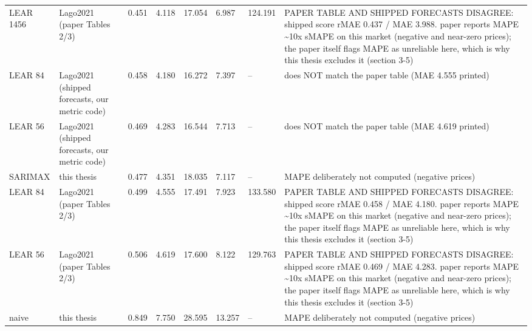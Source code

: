 \begin{table}[htbp]
\begin{tabular}{llllllll}
LEAR 1456 & Lago2021 (paper Tables 2/3) & 0.451 & 4.118 & 17.054 & 6.987 & 124.191 & PAPER TABLE AND SHIPPED FORECASTS DISAGREE: shipped score rMAE 0.437 / MAE 3.988. paper reports MAPE \textasciitilde 10x sMAPE on this market (negative and near-zero prices); the paper itself flags MAPE as unreliable here, which is why this thesis excludes it (section 3-5) \\
LEAR 84 & Lago2021 (shipped forecasts, our metric code) & 0.458 & 4.180 & 16.272 & 7.397 & -- & does NOT match the paper table (MAE 4.555 printed) \\
LEAR 56 & Lago2021 (shipped forecasts, our metric code) & 0.469 & 4.283 & 16.544 & 7.713 & -- & does NOT match the paper table (MAE 4.619 printed) \\
SARIMAX & this thesis & 0.477 & 4.351 & 18.035 & 7.117 & -- & MAPE deliberately not computed (negative prices) \\
LEAR 84 & Lago2021 (paper Tables 2/3) & 0.499 & 4.555 & 17.491 & 7.923 & 133.580 & PAPER TABLE AND SHIPPED FORECASTS DISAGREE: shipped score rMAE 0.458 / MAE 4.180. paper reports MAPE \textasciitilde 10x sMAPE on this market (negative and near-zero prices); the paper itself flags MAPE as unreliable here, which is why this thesis excludes it (section 3-5) \\
LEAR 56 & Lago2021 (paper Tables 2/3) & 0.506 & 4.619 & 17.600 & 8.122 & 129.763 & PAPER TABLE AND SHIPPED FORECASTS DISAGREE: shipped score rMAE 0.469 / MAE 4.283. paper reports MAPE \textasciitilde 10x sMAPE on this market (negative and near-zero prices); the paper itself flags MAPE as unreliable here, which is why this thesis excludes it (section 3-5) \\
naive & this thesis & 0.849 & 7.750 & 28.595 & 13.257 & -- & MAPE deliberately not computed (negative prices) \\
\bottomrule
\end{tabular}
\end{table}
